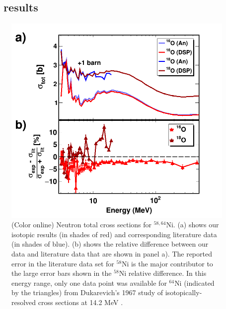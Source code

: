 \subsection{\oSixEight\ \tot\ results}
\begin{figure}
    \includegraphics[scale=0.35]{figures/TwoPanelO.png}
    \caption{(Color online) Neutron total cross sections for $^{58,64}$Ni.
        (a) shows our isotopic results (in shades of red) and
        corresponding literature data \cite{Perey1993, Dukarevich1967} (in
        shades of blue). (b) shows the relative difference between our data
        and literature data that are shown in panel a). The reported error in
        the literature data set for $^{58}$Ni is the major contributor to the
        large error bars shown in the $^{58}$Ni relative difference. In this
        energy range, only one data point was available for $^{64}$Ni (indicated
        by the triangles) from Dukarevich's 1967 study of isotopically-resolved cross
        sections at 14.2 MeV \cite{Dukarevich1967}.
    }
    \label{TwoPanelO}
\end{figure}

